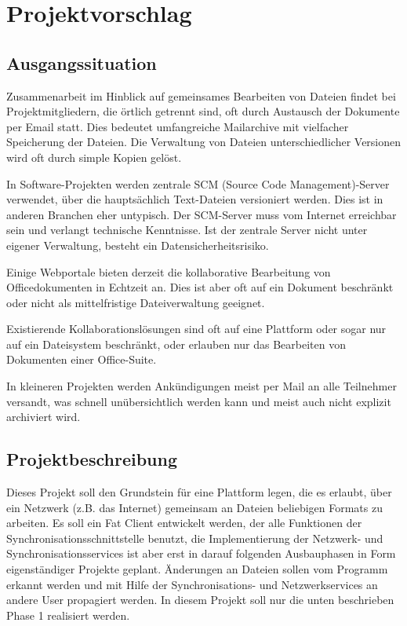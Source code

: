 \chapter{Projektvorschlag}
\thispagestyle{fancy}
\section{Ausgangssituation}
Zusammenarbeit im Hinblick auf gemeinsames Bearbeiten von Dateien findet bei Projektmitgliedern, die örtlich getrennt sind, oft durch Austausch der Dokumente per Email statt. Dies bedeutet umfangreiche Mailarchive mit vielfacher Speicherung der Dateien. Die Verwaltung von Dateien unterschiedlicher Versionen wird oft durch simple Kopien gelöst.

In Software-Projekten werden zentrale SCM (Source Code Management)-Server verwendet, über die hauptsächlich Text-Dateien versioniert werden. Dies ist in anderen Branchen eher untypisch. Der SCM-Server muss vom Internet erreichbar sein und verlangt technische Kenntnisse. Ist der zentrale Server nicht unter eigener Verwaltung, besteht ein Datensicherheitsrisiko.

Einige Webportale bieten derzeit die kollaborative Bearbeitung von Officedokumenten in Echtzeit an. Dies ist aber oft auf ein Dokument beschränkt oder nicht als mittelfristige Dateiverwaltung geeignet.

Existierende Kollaborationslösungen sind oft auf eine Plattform oder sogar nur auf ein Dateisystem beschränkt, oder erlauben nur das Bearbeiten von Dokumenten einer Office-Suite.

In kleineren Projekten werden Ankündigungen meist per Mail an alle Teilnehmer versandt, was schnell unübersichtlich werden kann und meist auch nicht explizit archiviert wird.

\section{Projektbeschreibung}
Dieses Projekt soll den Grundstein für eine Plattform legen, die es erlaubt, über ein Netzwerk (z.B. das Internet) gemeinsam an Dateien beliebigen Formats zu arbeiten. Es soll ein Fat Client entwickelt werden, der alle Funktionen der Synchronisationsschnittstelle benutzt, die Implementierung der Netzwerk- und Synchronisationsservices ist aber erst in darauf folgenden Ausbauphasen in Form eigenständiger Projekte geplant. Änderungen an Dateien sollen vom Programm erkannt werden und mit Hilfe der Synchronisations- und Netzwerkservices an andere User propagiert werden. In diesem Projekt soll nur die unten beschrieben Phase 1 realisiert werden.

